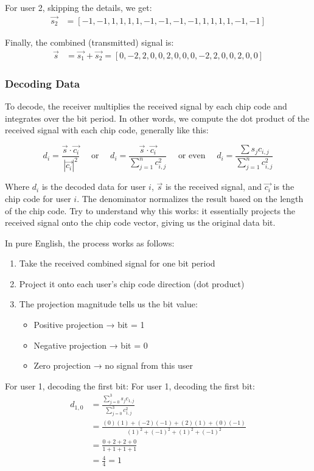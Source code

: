 For user 2, skipping the details, we get:
\begin{align*}
\vec{s_2} &= [-1, -1, 1, 1, 1, 1, -1, -1, -1, -1, 1, 1, 1, 1, -1, -1]
\end{align*}

Finally, the combined (transmitted) signal is:
\begin{align*}
\vec{s} &= \vec{s_1} + \vec{s_2} = [0, -2, 2, 0, 0, 2, 0, 0, 0, -2, 2, 0, 0, 2, 0, 0]
\end{align*}

\subsubsection{Decoding Data}
To decode, the receiver multiplies the received signal by each chip code and integrates over the bit period. In other words, we compute the dot product of the received signal with each chip code, generally like this:

\[
d_i = \frac{\vec{s} \cdot \vec{c_i}}{|\vec{c_i}|^2}
\quad\text{ or }\quad
d_i = \frac{\vec{s} \cdot \vec{c_i}}{\sum_{j=1}^{n} c_{i,j}^2}
\quad\text{ or even }\quad
d_i = \frac{\sum{s_j c_{i,j}}}{\sum_{j=1}^{n} c_{i,j}^2}
\]

Where $d_i$ is the decoded data for user $i$, $\vec{s}$ is the received signal, and $\vec{c_i}$ is the chip code for user $i$. The denominator normalizes the result based on the length of the chip code. Try to understand why this works: it essentially projects the received signal onto the chip code vector, giving us the original data bit.

In pure English, the process works as follows:
\begin{enumerate}
    \item Take the received combined signal for one bit period
    \item Project it onto each user's chip code direction (dot product)
    \item The projection magnitude tells us the bit value:
    \begin{itemize}
        \item Positive projection → bit = 1
        \item Negative projection → bit = 0
        \item Zero projection → no signal from this user
    \end{itemize}
\end{enumerate}

For user 1, decoding the first bit:
For user 1, decoding the first bit:
\begin{align*}
d_{1,0} &= \frac{\sum_{j=0}^{3} s_j c_{1,j}}{\sum_{j=0}^{3} c_{1,j}^2}\\
&= \frac{(0)(1) + (-2)(-1) + (2)(1) + (0)(-1)}{(1)^2 + (-1)^2 + (1)^2 + (-1)^2}\\
&= \frac{0 + 2 + 2 + 0}{1 + 1 + 1 + 1}\\
&= \frac{4}{4} = 1
\end{align*}

